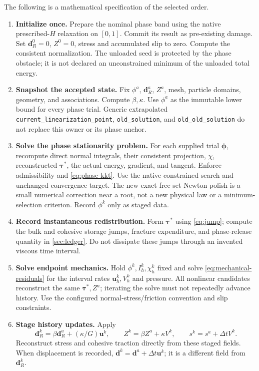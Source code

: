 \documentclass[11pt,a4paper]{article}
\newcommand{\tauv}{\bm\tau}
\newcommand{\vect}[1]{\boldsymbol{#1}}
\begin{document}
The following is a mathematical specification of the selected order.
\begin{enumerate}[label=\textbf{\arabic*.},itemsep=6pt]
 \item \textbf{Initialize once.} Prepare the nominal phase band using the native
 prescribed-$H$ relaxation on $[0,1]$. Commit its result as pre-existing damage.
 Set $\bm d_R^0=0$, $Z^0=0$, stress and accumulated slip to zero. Compute the
 consistent normalization. The unloaded seed is protected by the phase obstacle;
 it is not declared an unconstrained minimum of the unloaded total energy.

 \item \textbf{Snapshot the accepted state.} Fix $\phi^a$, $\bm d_R^a$, $Z^a$,
 mesh, particle domains, geometry, and associations. Compute $\beta,\kappa$.
 Use $\phi^a$ as the immutable lower bound for every phase trial. Generic
 extrapolated \texttt{current\_linearization\_point}, \texttt{old\_solution},
 and \texttt{old\_old\_solution} do not replace this owner or its phase anchor.

 \item \textbf{Solve the phase stationarity problem.} For each supplied trial
 $\vect\phi$, recompute direct normal integrals, their consistent projection,
 $\chi$, reconstructed $\tauv^*$, the actual energy, gradient, and tangent.
 Enforce admissibility and \cref{eq:phase-kkt}. Use the native constrained
 search and unchanged convergence target. The new exact free-set Newton
 polish is a small numerical correction near a root, not a new physical law
 or a minimum-selection criterion. Record $\phi^k$ only as staged data.

 \item \textbf{Record instantaneous redistribution.} Form $\tauv^*$ using
 \cref{eq:jump}; compute the bulk and cohesive storage jumps, fracture
 expenditure, and phase-release quantity in \cref{sec:ledger}. Do not
 dissipate these jumps through an invented viscous time interval.

 \item \textbf{Solve endpoint mechanics.} Hold $\phi^k,I_h^k,\chi_h^k$
 fixed and solve \cref{eq:mechanical-residuals} for the interval rates
 $\bm u_h^k,V_h^k$ and pressure. All nonlinear candidates reconstruct the
 same $\tauv^*,Z^a$; iterating the solve must not repeatedly advance history.
 Use the configured normal-stress/friction convention and slip constraints.

 \item \textbf{Stage history updates.} Apply
 \[
 \bm d_R^k=\beta\bm d_R^a+(\kappa/G)\bm u^k,\qquad
 Z^k=\beta Z^a+\kappa V^k,\qquad
 s^k=s^a+\Delta t V^k.
 \]
 Reconstruct stress and cohesive traction directly from these staged fields.
 When displacement is recorded, $\bm d^k=\bm d^a+\Delta t\bm u^k$;
 it is a different field from $\bm d_R^k$.


\end{enumerate}
\end{document}
